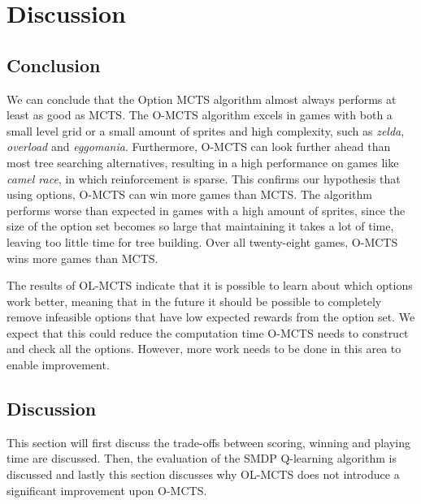 \chapter{Discussion}
\label{sec:conclusion}

\section{Conclusion}
We can conclude that the Option MCTS algorithm almost always performs at least
as good as MCTS. The O-MCTS algorithm excels in games with both a small level
grid or a small amount of sprites and high complexity, such as \textit{zelda},
\textit{overload} and \textit{eggomania}.  Furthermore, O-MCTS can look further
ahead than most tree searching alternatives, resulting in a high performance on
games like \textit{camel race}, in which reinforcement is sparse. This confirms
our hypothesis that using options, O-MCTS can win more games than MCTS. The
algorithm performs worse than expected in games with a high amount of sprites,
since the size of the option set becomes so large that maintaining it takes a
lot of time, leaving too little time for tree building. Over all twenty-eight
games, O-MCTS wins more games than MCTS.

The results of OL-MCTS indicate that it is possible to learn about which options
work better, meaning that in the future it should be possible to completely
remove infeasible options that have low expected rewards from the option set. We
expect that this could reduce the computation time O-MCTS needs to construct and
check all the options. However, more work needs to be done in this area to
enable improvement.

\section{Discussion}
This section will first discuss the trade-offs between scoring, winning and
playing time are discussed. Then, the evaluation of the SMDP Q-learning
algorithm is discussed and lastly this section discusses why OL-MCTS does not
introduce a significant improvement upon O-MCTS.

